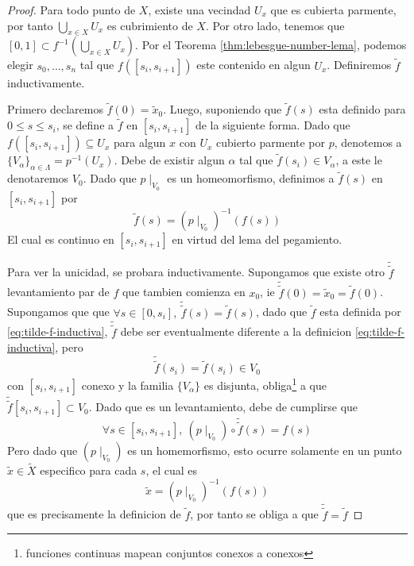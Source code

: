 \begin{proof}
  Para todo punto de \(X\), existe una vecindad \(U_x\) que es
  cubierta parmente, por tanto \(\bigcup_{x \in X} U_x\) es cubrimiento
  de \(X\). Por otro lado, tenemos que \( [0,1] \subset f^{-1}
  (\bigcup_{x \in X} U_x)\). Por el Teorema
  \ref{thm:lebesgue-number-lema}, podemos elegir \(s_0,\dotsc,s_n\) tal
  que \(f([s_i, s_{i+1}])\) este contenido en algun \(U_x\). Definiremos
  \(\tilde f\) inductivamente.

  Primero declaremos \(\tilde f (0) = \tilde x _0\). Luego, suponiendo
  que \(\tilde f (s)\) esta definido para \(0 \leq s \leq s_i\), se
  define a \(\tilde f \) en \([s_i, s_{i+1}]\) de la siguiente forma.
  Dado que \(f ([s_i, s_{i+1}]) \subseteq U_x\) para algun \(x\) con
  \(U_x\) cubierto parmente por \(p\), denotemos a
  \(\{V_\alpha\}_{\alpha \in \Lambda} = p^{-1} (U_x)\). Debe de existir
  algun \(\alpha\) tal que \(\tilde f (s_i) \in V_\alpha\), a este le
  denotaremos \(V_0\). Dado que \(p \mid_{V_0}\) es un homeomorfismo,
  definimos a \(\tilde f (s)\) en \([s_i, s_{i+1}]\) por
  \begin{equation}
  \tilde f (s) = (p \mid _{V_0})^{-1} (f(s))\label{eq:tilde-f-inductiva}
  \end{equation}
  El cual es continuo en \([s_i, s_{i+1}]\) en virtud del lema del pegamiento.

  Para ver la unicidad, se probara inductivamente. Supongamos que existe
  otro \(\tilde{\tilde f}\) levantamiento par de \(f\) que tambien
  comienza en \(x_0\), ie \(\tilde{\tilde f} (0) = \tilde x _0 = \tilde f
  (0)\). Supongamos que que \(\forall s \in [0, s_i],\ \tilde{\tilde f}
  (s) = \tilde f (s)\), dado que \(\tilde f\) esta definida por
  \eqref{eq:tilde-f-inductiva}, \(\tilde {\tilde f}\) debe ser
  eventualmente diferente a la definicion \eqref{eq:tilde-f-inductiva},
  pero
  \[\tilde {\tilde f} (s_i) = \tilde f (s_i) \in V_0\]
  con \([s_i, s_{i+1}]\) conexo y la familia \(\{V_\alpha\}\)
  es disjunta, obliga\footnote{funciones continuas mapean conjuntos
    conexos a conexos} a que \(\tilde {\tilde f} [s_i, s_{i+1}] \subset
  V_0\). Dado que es un levantamiento, debe de cumplirse que
  \[\forall s \in [s_i, s_{i+1}],\ (p \mid_{V_0}) \circ \tilde {\tilde
      f} (s) = f(s)\]
  Pero dado que \((p \mid_{V_0})\) es un homemorfismo, esto ocurre
  solamente en un punto \(\tilde x \in \tilde X\) especifico para cada
  \(s\), el cual es
  \[ \tilde x = (p \mid_{V_0})^{-1} (f(s))\]
  que es precisamente la definicion de \(\tilde f\), por tanto se obliga
  a que \( \tilde {\tilde f} = \tilde f\)
\end{proof}
